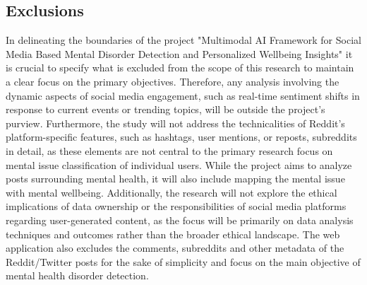 \subsection{Exclusions}
\noindent
In delineating the boundaries of the project "Multimodal AI Framework for Social Media Based Mental Disorder Detection and Personalized Wellbeing Insights" it is crucial to specify what is excluded from the scope of this research to maintain a clear focus on the primary objectives. Therefore, any analysis involving the dynamic aspects of social media engagement, such as real-time sentiment shifts in response to current events or trending topics, will be outside the project's purview. Furthermore, the study will not address the technicalities of Reddit’s platform-specific features, such as hashtags, user mentions, or reposts, subreddits in detail, as these elements are not central to the primary research focus on mental issue classification of individual users. While the project aims to analyze posts surrounding mental health, it will also include mapping the mental issue with mental wellbeing. Additionally, the research will not explore the ethical implications of data ownership or the responsibilities of social media platforms regarding user-generated content, as the focus will be primarily on data analysis techniques and outcomes rather than the broader ethical landscape. The web application also excludes the comments, subreddits and other metadata of the Reddit/Twitter posts for the sake of simplicity and focus on the main objective of mental health disorder detection.

